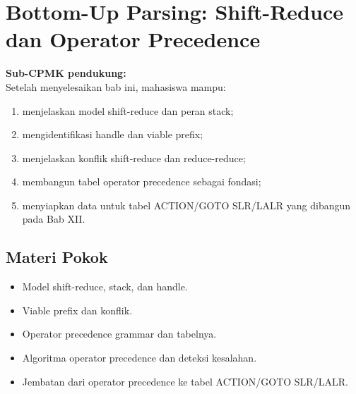 \documentclass[../../main.tex]{subfiles}
\begin{document}
\chapter[Bottom-Up Parsing]{Bottom-Up Parsing: Shift-Reduce\\ dan Operator Precedence}
\label{chap:bottom-up}

\begin{outcomebox}
\textbf{Sub-CPMK pendukung:} \\[3pt]
Setelah menyelesaikan bab ini, mahasiswa mampu:
\begin{enumerate}[label=\arabic*.,leftmargin=*]
  \item menjelaskan model shift-reduce dan peran stack;
  \item mengidentifikasi handle dan viable prefix;
  \item menjelaskan konflik shift-reduce dan reduce-reduce;
  \item membangun tabel operator precedence sebagai fondasi;
  \item menyiapkan data untuk tabel ACTION/GOTO SLR/LALR yang
        dibangun pada Bab XII.
\end{enumerate}
\end{outcomebox}

\section*{Materi Pokok}
\begin{itemize}[leftmargin=*]
  \item Model shift-reduce, stack, dan handle.
  \item Viable prefix dan konflik.
  \item Operator precedence grammar dan tabelnya.
  \item Algoritma operator precedence dan deteksi kesalahan.
  \item Jembatan dari operator precedence ke tabel ACTION/GOTO
        SLR/LALR.
\end{itemize}















\ifSubfilesClassLoaded{%
}{}
\end{document}
